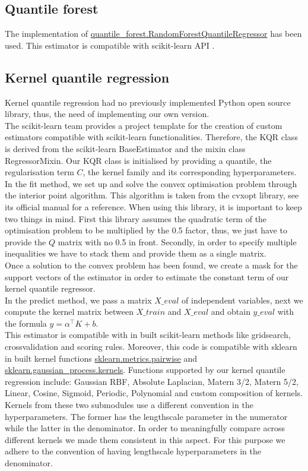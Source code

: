 \subsection{Quantile forest}
The implementation of \href{https://pypi.org/project/quantile-forest/}{quantile\_forest.RandomForestQuantileRegressor} has been used. This estimator is compatible with scikit-learn API \cite{Johnson2024}.
\subsection{Kernel quantile regression}
Kernel quantile regression had no previously implemented Python open source library, thus, the need of implementing our own version.
\\
The scikit-learn team provides a project template for the creation of custom estimators compatible with scikit-learn functionalities. Therefore, the KQR class is derived from the scikit-learn BaseEstimator and the mixin class RegressorMixin.
Our KQR class is initialised by providing a quantile, the regularisation term $C$, the kernel family and its corresponding hyperparameters.
\\
In the fit method, we set up and solve the convex optimisation problem through the interior point algorithm. This algorithm is taken from the cvxopt library, see its official manual  for a reference.
When using this library, it is important to keep two things in mind. First this library assumes the quadratic term of the optimisation problem to be multiplied by the 0.5 factor, thus, we just have to provide the $Q$ matrix with no 0.5 in front.
Secondly, in order to specify multiple inequalities we have to stack them and provide them as a single matrix.
\\
Once a solution to the convex problem has been found, we create a mask for the support vectors of the estimator in order to estimate the constant term of our kernel quantile regressor.
\\
In the predict method, we pass a matrix $X\_eval$ of independent variables, next we compute the kernel matrix between $X\_train$ and $X\_eval$ and obtain $y\_eval$ with the formula $y=\alpha^\intercal K+b$.
\\
This estimator is compatible with in built scikit-learn methods like gridsearch, crossvalidation and scoring rules. Moreover, this code is compatible with sklearn in built kernel functions \href{https://scikit-learn.org/stable/api/sklearn.metrics.html}{sklearn.metrics.pairwise} and \href{https://scikit-learn.org/stable/api/sklearn.gaussian_process.html}{sklearn.gaussian\_process.kernels}. Functions supported by our kernel quantile regression include: Gaussian RBF, Absolute Laplacian, Matern 3/2, Matern 5/2, Linear, Cosine, Sigmoid, Periodic, Polynomial and custom composition of kernels. 
Kernels from these two submodules use a different convention in the hyperparameters. The former has the lengthscale parameter in the numerator while the latter in the denominator. In order to meaningfully compare across different kernels we made them consistent in this aspect. For this purpose we adhere to the convention of having lengthscale hyperparameters in the denominator.

